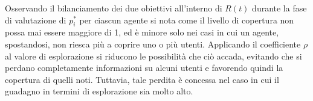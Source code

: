 Osservando il bilanciamento dei due obiettivi all'interno di $R(t)$ durante la fase di valutazione di $p_i^*$ per ciascun agente si nota come il livello di copertura non possa mai essere maggiore di 1, ed è minore solo nei casi in cui un agente, spostandosi, non riesca più a coprire uno o più utenti.
Applicando il coefficiente $\rho$ al valore di esplorazione si riducono le possibilità che ciò accada, evitando che si perdano completamente informazioni su alcuni utenti e favorendo quindi la copertura di quelli noti.
Tuttavia, tale perdita è concessa nel caso in cui il guadagno in termini di esplorazione sia molto alto.